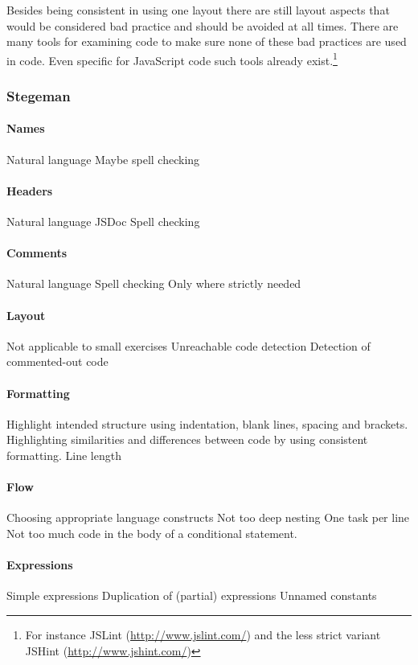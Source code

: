 Besides being consistent in using one layout there are still layout aspects
that would be considered bad practice and should be avoided at all times. There
are many tools for examining code to make sure none of these bad practices are
used in code. Even specific for JavaScript code such tools already
exist.\footnote{For instance JSLint (\url{http://www.jslint.com/}) and the less
strict variant JSHint (\url{http://www.jshint.com/})}

\subsubsection{Stegeman}

\paragraph{Names}
Natural language
Maybe spell checking

\paragraph{Headers}
Natural language
JSDoc
Spell checking

\paragraph{Comments}
Natural language
Spell checking
Only where strictly needed

\paragraph{Layout}
Not applicable to small exercises
Unreachable code detection
Detection of commented-out code

\paragraph{Formatting}
Highlight intended structure using
indentation, blank lines, spacing and brackets.
Highlighting similarities and differences between code
by using consistent formatting.
Line length

\paragraph{Flow}
Choosing appropriate language constructs
Not too deep nesting
One task per line
Not too much code in the body of a conditional statement.

\paragraph{Expressions}
Simple expressions
Duplication of (partial) expressions
Unnamed constants

